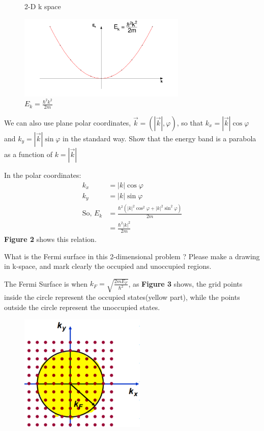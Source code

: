 \documentclass[answers]{exam}
\begin{document}
\begin{questions}
\begin{figure}[htbp]
\begin{minipage}[t]{0.45\textwidth}
\caption{2-D k space}
\end{minipage}
\begin{minipage}[t]{0.45\textwidth}
\centering
\includegraphics[width=8cm]{Figure/c.png}
\caption{$E_{k}=\frac{\hbar^2k^2}{2m}$}
\end{minipage}
\end{figure}
\question We can also use plane polar coordinates, $\vec{k}=(|\vec{k}|,\varphi)$, so that $k_{x}=|\vec{k}|\cos\varphi$ and $k_{y}=|\vec{k}|\sin\varphi$ in the standard way. Show that the energy band is a parabola as a function of $k=|\vec{k}|$
\begin{solution}
In the polar coordinates:
\begin{align*}
k_{x} &=|k| \cos \varphi \\
k_{y} &=|k| \sin \varphi \\
\text{So, } E_{k} &=\frac{\hbar^{2}\left(\left|k\right|^{2} \cos ^{2} \varphi+|k|^{2} \sin ^{2} \varphi\right)}{2 m}  \\
&=\frac{\hbar^{2} |k|^{2}}{2 m}
\end{align*}
\textbf{Figure 2} shows this relation.
\end{solution}
\newpage
\question  What is the Fermi surface in this 2-dimensional problem ? Please make a drawing in k-space, and mark clearly the occupied and unoccupied regions.
\begin{solution}
The Fermi Surface is when $k_{F}=\sqrt{\frac{2 m E_{F}}{\hbar^{2}}}$, as \textbf{Figure 3} shows, the grid points inside the circle represent the occupied states(yellow part),
while the points outside the circle represent the unoccupied states. 
\end{solution}
\begin{figure}[htbp]
    \centering
    \includegraphics[width=6cm]{Figure/2.png}

\end{figure}
\end{questions}
\end{document}
